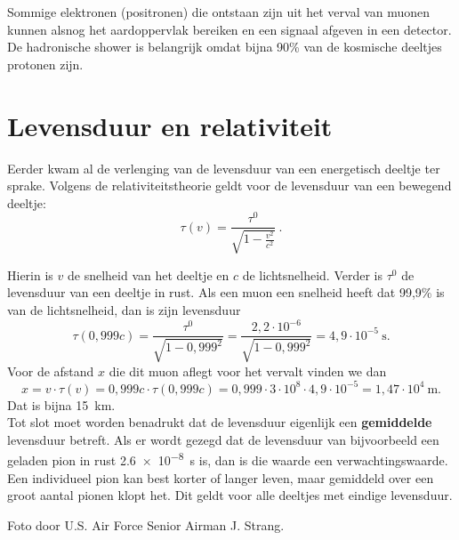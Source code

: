 Sommige elektronen (positronen) die ontstaan zijn uit het verval van
muonen kunnen alsnog het aardoppervlak bereiken en een signaal afgeven
in een \hisparc detector.
\\

De hadronische shower is belangrijk omdat bijna 90\% van de kosmische
deeltjes protonen zijn.
 

\section{Levensduur en relativiteit}

Eerder kwam al de verlenging van de levensduur van een energetisch
deeltje ter sprake. Volgens de relativiteitstheorie geldt voor de
levensduur van een bewegend deeltje:
\begin{equation}
    \tau (v) = \frac{\tau^0}{\sqrt{1-\frac{v^2}{c^2}}} \ . \nonumber
\end{equation}

Hierin is $v$ de snelheid van het deeltje en $c$ de lichtsnelheid.
Verder is $\tau^0$ de levensduur van een deeltje in rust. Als een muon
een snelheid heeft dat 99,9\% is van de lichtsnelheid, dan is zijn
levensduur 
\begin{equation}
    \tau(0,999c) = \frac{\tau^0}{\sqrt{1-0,999^2}}
    = \frac{2,2 \cdot 10^{-6}}{\sqrt{1-0,999^2}}
    = 4,9 \cdot 10^{-5} \SI{}{\second}. \nonumber
\end{equation}
Voor de afstand $x$ die dit muon aflegt voor het vervalt vinden we dan 
\begin{equation}
    x = v \cdot \tau (v)
    = 0,999c \cdot \tau (0,999c)
    = 0,999 \cdot 3 \cdot 10^8 \cdot 4,9 \cdot 10^{-5}
    = 1,47 \cdot 10^4 \SI{}{\meter}. \nonumber
\end{equation}
Dat is bijna \SI{15}{\km}. 
\\

Tot slot moet worden benadrukt dat de levensduur eigenlijk een
\textbf{gemiddelde} levensduur betreft. Als er wordt gezegd dat de
levensduur van bijvoorbeeld een geladen pion in rust
\SI{2,6e-8}{\second} is, dan is die waarde een verwachtingswaarde. Een
individueel pion kan best korter of langer leven, maar gemiddeld over
een groot aantal pionen klopt het. Dit geldt voor alle deeltjes met
eindige levensduur.


\begin{thebibliography}{9}
     Foto door U.S. Air Force Senior Airman J. Strang.
\end{thebibliography}



